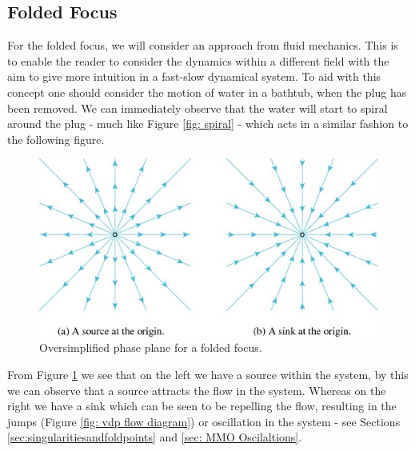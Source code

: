 \subsection{Folded Focus}\label{a: sink\source}
For the folded focus, we will consider an approach from fluid mechanics. This is to enable the reader to consider the dynamics within a different field with the aim to give more intuition in a fast-slow dynamical system. To aid with this concept one should consider the motion of water in a bathtub, when the plug has been removed. We can immediately observe that the water will start to spiral around the plug - much like Figure \ref{fig: spiral} - which acts in a similar fashion to the following figure. 
\begin{figure}[h!]
	\centering
\includegraphics[width=0.7\linewidth]{Images/sourcesink}
	\caption{Oversimplified phase plane for a folded focus.}
	\label{fig:source-sink}
\end{figure}
From Figure \ref{fig:source-sink} we see that on the left we have a source within the system, by this we can observe that a source attracts the flow in the system. Whereas on the right we have a sink which can be seen to be repelling the flow, resulting in the jumps (Figure \ref{fig: vdp flow diagram}) or oscillation in the system - see Sections \ref{sec:singularitiesandfoldpoints} and \ref{sec: MMO Oscilaltions}. 